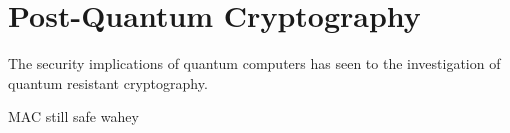 \section{Post-Quantum Cryptography}
The security implications of quantum computers has seen to the investigation of quantum resistant cryptography. 

MAC still safe wahey







